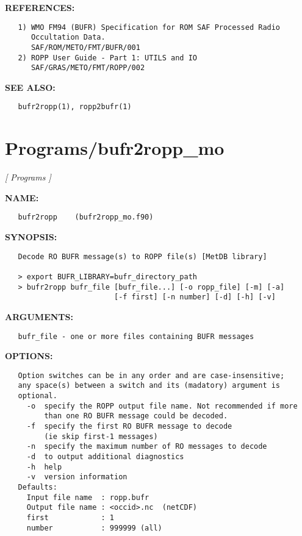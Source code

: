 \textbf{REFERENCES:}\hspace{0.08in}\begin{Verbatim}
   1) WMO FM94 (BUFR) Specification for ROM SAF Processed Radio
      Occultation Data.
      SAF/ROM/METO/FMT/BUFR/001
   2) ROPP User Guide - Part 1: UTILS and IO
      SAF/GRAS/METO/FMT/ROPP/002
\end{Verbatim}
\textbf{SEE ALSO:}\hspace{0.08in}\begin{Verbatim}
   bufr2ropp(1), ropp2bufr(1)
\end{Verbatim}
\section{Programs/bufr2ropp\_mo}
\textsl{[ Programs ]}

\label{ch:robo81}
\label{ch:Programs_bufr2ropp_mo}
\textbf{NAME:}\hspace{0.08in}\begin{Verbatim}
   bufr2ropp    (bufr2ropp_mo.f90)
\end{Verbatim}
\textbf{SYNOPSIS:}\hspace{0.08in}\begin{Verbatim}
   Decode RO BUFR message(s) to ROPP file(s) [MetDB library]

   > export BUFR_LIBRARY=bufr_directory_path
   > bufr2ropp bufr_file [bufr_file...] [-o ropp_file] [-m] [-a]
                         [-f first] [-n number] [-d] [-h] [-v]
\end{Verbatim}
\textbf{ARGUMENTS:}\hspace{0.08in}\begin{Verbatim}
   bufr_file - one or more files containing BUFR messages
\end{Verbatim}
\textbf{OPTIONS:}\hspace{0.08in}\begin{Verbatim}
   Option switches can be in any order and are case-insensitive;
   any space(s) between a switch and its (madatory) argument is
   optional.
     -o  specify the ROPP output file name. Not recommended if more
         than one RO BUFR message could be decoded.
     -f  specify the first RO BUFR message to decode
         (ie skip first-1 messages)
     -n  specify the maximum number of RO messages to decode
     -d  to output additional diagnostics
     -h  help
     -v  version information
   Defaults:
     Input file name  : ropp.bufr
     Output file name : <occid>.nc  (netCDF)
     first            : 1
     number           : 999999 (all)
\end{Verbatim}
